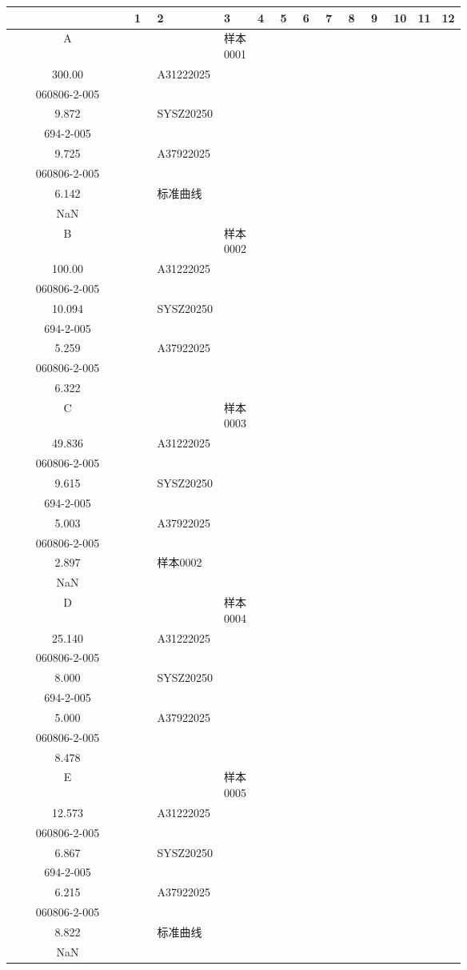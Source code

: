 \documentclass[UTF8,10pt,a4paper,fontset=fandol]{ctexart}
\begin{document}
\begin{center}
\scriptsize
\begin{tabular}{c|*{12}{p{0.055\linewidth}|}}
 &1&2&3&4&5&6&7&8&9&10&11&12\\ \hline
A&&&样本0001\\300.00&&
A31222025\\060806-2-005\\9.872&&
SYSZ20250\\694-2-005\\9.725&&
A37922025\\060806-2-005\\6.142&&
标准曲线\\NaN&&\\ \hline
B&&&样本0002\\100.00&&
A31222025\\060806-2-005\\10.094&&
SYSZ20250\\694-2-005\\5.259&&
A37922025\\060806-2-005\\6.322&&&&\\ \hline
C&&&样本0003\\49.836&&
A31222025\\060806-2-005\\9.615&&
SYSZ20250\\694-2-005\\5.003&&
A37922025\\060806-2-005\\2.897&&
样本0002\\NaN&&\\ \hline
D&&&样本0004\\25.140&&
A31222025\\060806-2-005\\8.000&&
SYSZ20250\\694-2-005\\5.000&&
A37922025\\060806-2-005\\8.478&&&&\\ \hline
E&&&样本0005\\12.573&&
A31222025\\060806-2-005\\6.867&&
SYSZ20250\\694-2-005\\6.215&&
A37922025\\060806-2-005\\8.822&&
标准曲线\\NaN&&\\ \hline

\end{tabular}
\end{center}
\end{document}
